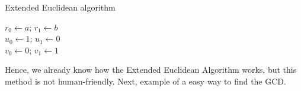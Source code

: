 \documentclass[../lecture-notes.tex]{subfiles}
\begin{document}
\begin{algorithm}
    \caption{Extended Euclidean algorithm} \label{extended_euclidean_algorithm}
        
    $r_{0} \gets a; \, r_{1} \gets b$ \\ %
    $u_{0} \gets 1; \, u_{1} \gets 0$ \\
    $v_{0} \gets 0; \, v_{1} \gets 1$ \\

\end{algorithm}

Hence, we already know how the Extended Euclidean Algorithm works, but this method is not human-friendly. Next, example of a easy way to find the GCD.
\end{document}
